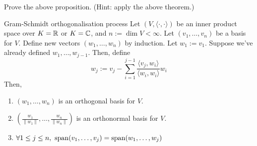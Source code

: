 \documentclass[12pt]{article}
\begin{document}
\begin{exercise}{}{}
    Prove the above proposition. (Hint: apply the above theorem.)
\end{exercise}

\begin{theorem}{Gram-Schmidt orthogonalisation process}{}
    Let $(V, \langle \cdot, \cdot \rangle)$ be an inner product space over $K = \mathbb{R}$ or $K = \mathbb{C}$, and $n := \dim V < \infty$. Let $(v_1,\dots,v_n)$ be a basis for $V$. Define new vectors $(w_1,\dots,w_n)$ by induction.
    Let $w_1 := v_1$. Suppose we've already defined $w_1,\dots, w_{j-1}$. Then, define 
    $$
        w_j := v_j - \sum_{i = 1}^{j - 1} \frac{\langle v_j, w_i \rangle}{\langle w_i, w_i \rangle} w_i
    $$
    Then,
    \begin{enumerate}
        \item $(w_1,\dots,w_n)$ is an orthogonal basis for $V$.
        \item $(\frac{w_1}{\lVert w_1 \rVert}, \dots, \frac{w_n}{\lVert w_n \rVert})$ is an orthonormal basis for $V$.
        \item $\forall 1 \leq j \leq n,\ \Span(v_1,\dots,v_j) = \Span(w_1,\dots,w_j)$
    \end{enumerate}
\end{theorem}
\end{document}
